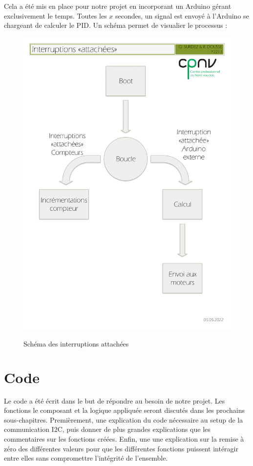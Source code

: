 \documentclass[
	a4paper,									%
	11pt,										%
	twoside,									%
	openright,									%
	notitlepage,									%
	parskip=half,								%
]{scrreprt}										%
\begin{document}
Cela a été mis en place pour notre projet en incorporant un Arduino gérant exclusivement le temps. Toutes les $x$ secondes, un signal est envoyé à l'Arduino se chargeant de calculer le PID. Un schéma permet de visualier 
le processus : 
\par

\begin{figure}
	\centering
	\includegraphics[scale=0.2]{img/interruptions_attachees.jpg}
	\label{IntSch}
	\caption{Schéma des interruptions attachées}
	
\end{figure}


\chapter{Code}

Le code a été écrit dans le but de répondre au besoin de notre projet. Les fonctions le composant et la logique appliquée
seront discutés dans les prochains sous-chapitres. Premièrement, une explication du code nécessaire au setup de la
communication I2C, puis donner de plus grandes explications que les commentaires sur les fonctions créées. Enfin, une
une explication sur la remise à zéro des différentes valeurs pour que les différentes fonctions puissent intéragir entre
elles sans compromettre l'intégrité de l'ensemble.
\end{document}
